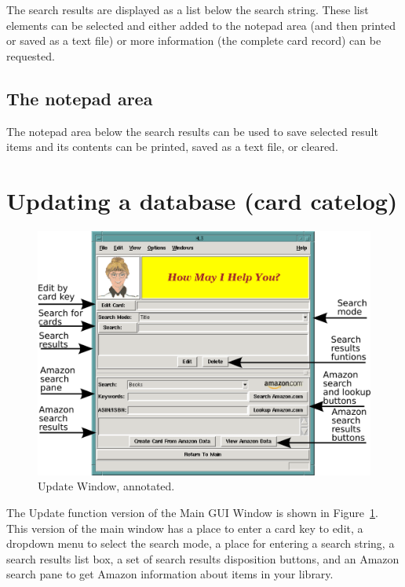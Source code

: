 The search results are displayed as a list below the search string. 
These list elements can be selected and either added to the notepad
area (and then printed or saved as a text file) or more information
(the complete card record) can be requested.  

\subsection{The notepad area}

The notepad area below the search results can be used to save selected
result items and its contents can be printed, saved as a text file, or
cleared.

\section{Updating a database (card catelog)}
\label{sect:ref:update}

\begin{figure}[hpt]
\begin{centering}
\includegraphics[width=5in]{UpdateWindowAnnotated.png}
\caption{Update Window, annotated.}
\label{fig:ref:updatewindowAnno}
\end{centering}
\end{figure}
The Update function version of the Main GUI Window is shown in
Figure~\ref{fig:ref:updatewindowAnno}.  This version of the main window
has a place to enter a card key to edit, a dropdown menu to select the
search mode, a place for entering a search string, a search results
list box, a set of search results disposition buttons, and an Amazon search
pane to get Amazon information about items in your library.

